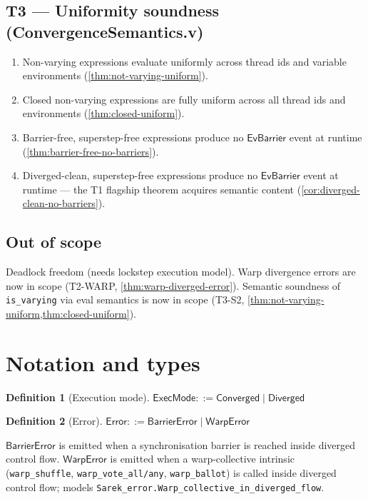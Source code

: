 \documentclass[11pt,a4paper]{article}
\theoremstyle{definition}
\newtheorem{definition}{Definition}[section]
\theoremstyle{plain}
\theoremstyle{remark}
\newcommand{\Converged}{\mathsf{Converged}}
\newcommand{\Diverged}{\mathsf{Diverged}}
\begin{document}
\subsection*{T3 --- Uniformity soundness (ConvergenceSemantics.v)}

\begin{enumerate}
  \item[\textbf{T3}] Non-varying expressions evaluate uniformly across thread ids
        and variable environments (\cref{thm:not-varying-uniform}).
  \item[\textbf{T3}] Closed non-varying expressions are fully uniform across all
        thread ids and environments (\cref{thm:closed-uniform}).
  \item[\textbf{T3}] Barrier-free, superstep-free expressions produce no
        $\mathsf{EvBarrier}$ event at runtime
        (\cref{thm:barrier-free-no-barriers}).
  \item[\textbf{T3}] Diverged-clean, superstep-free expressions produce no
        $\mathsf{EvBarrier}$ event at runtime --- the T1 flagship theorem acquires
        semantic content (\cref{cor:diverged-clean-no-barriers}).
\end{enumerate}

\subsection*{Out of scope}

Deadlock freedom (needs lockstep execution model).
Warp divergence errors are now in scope (T2-WARP, \cref{thm:warp-diverged-error}).
Semantic soundness of \texttt{is\_varying} via eval semantics is now in scope
(T3-S2, \cref{thm:not-varying-uniform,thm:closed-uniform}).

\section{Notation and types}
\label{sec:notation}

\begin{definition}[Execution mode]
$\mathsf{ExecMode} ::= \Converged \mid \Diverged$
\end{definition}

\begin{definition}[Error]
$\mathsf{Error} ::= \mathsf{BarrierError} \mid \mathsf{WarpError}$

$\mathsf{BarrierError}$ is emitted when a synchronisation barrier is reached
inside diverged control flow. $\mathsf{WarpError}$ is emitted when a
warp-collective intrinsic (\texttt{warp\_shuffle}, \texttt{warp\_vote\_all/any},
\texttt{warp\_ballot}) is called inside diverged control flow; models
\texttt{Sarek\_error.Warp\_collective\_in\_diverged\_flow}.
\end{definition}
\end{document}
